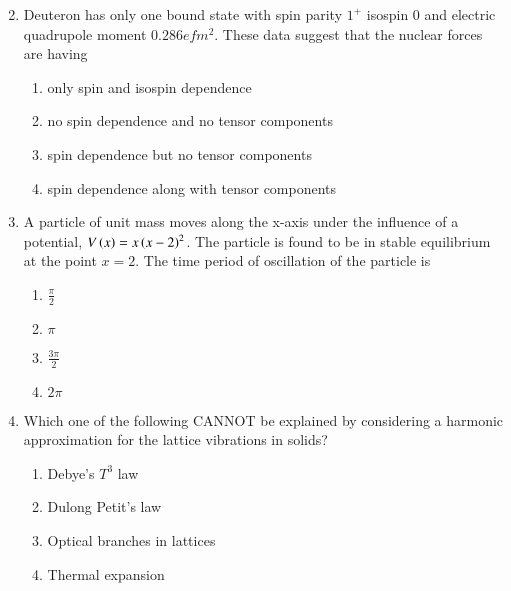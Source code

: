\documentclass[journal]{IEEEtran}
\begin{document}
\begin{enumerate}[start=14]
\begin{multicols}{2}
\begin{enumerate}
\begin{figure}[H]
\label{fig:my_label}
\end{figure}
        \end{enumerate}
        
    \end{multicols}


    \item Deuteron has only one bound state with spin parity $1^+$ isospin $0$ and electric quadrupole moment 
    $0.286 efm^2$. These data suggest that the nuclear forces are having 
    \begin{enumerate}
        \item only spin and isospin dependence
        \item no spin dependence and no tensor components
        \item spin dependence but no tensor components
        \item spin dependence along with tensor components
    \end{enumerate}

    \item A particle of unit mass moves along the x-axis under the influence of a potential, $V\left(x\right) = x\left(x-2\right)^2$. The particle is found to be in stable equilibrium at the point $x=2$. The time period of oscillation of the particle is
    \begin{multicols}{4}
        \begin{enumerate}
            \item $\frac{\pi}{2}$
            \item $\pi$
            \item $\frac{3 \pi}{2}$
            \item $2\pi$
        \end{enumerate}
    \end{multicols}

    \item Which one of the following CANNOT be explained by considering a harmonic approximation for the lattice vibrations in solids?
    \begin{multicols}{2}
        \begin{enumerate}
            \item Debye's $T^3$ law
            \item Dulong Petit's law
            \item Optical branches in lattices
            \item Thermal expansion
        \end{enumerate}
    \end{multicols}


\end{enumerate}
\end{document}
